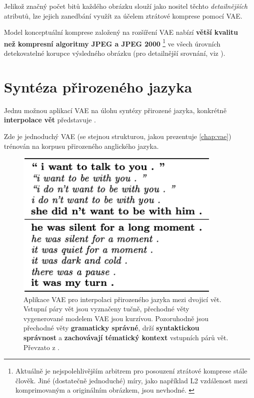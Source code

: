 Jelikož značný počet bitů každého obrázku slouží jako nositel těchto \emph{detailnějších} atributů, lze jejich zanedbání využít za účelem ztrátové komprese pomocí VAE.

Model konceptuální komprese založený na rozšíření VAE nabízí \textbf{větší kvalitu než kompresní algoritmy JPEG a JPEG 2000}
\footnote{Aktuálně je nejspolehlivějším arbitrem pro posouzení ztrátové komprese stále člověk. Jiné (dostatečně jednoduché) míry, jako například L2 vzdálenost mezi komprimovaným a originálním obrázkem, jsou nevhodné. \cite{Gregor2016}} ve všech úrovních detekovatelné korupce výsledného obrázku (pro detailnější srovnání, viz \cite{Gregor2016}).

\newpage
\section{Syntéza přirozeného jazyka}
\label{sec:applications_language_synthesis}
Jednu možnou aplikací VAE na úlohu syntézy přirozené jazyka, konkrétně \textbf{interpolace vět} představuje \cite{Bowman2016}.

Zde je jednoduchý VAE (se stejnou strukturou, jakou prezentuje \autoref{chap:vae}) trénován na korpusu přirozeného anglického jazyka.

\begin{figure}[H]
    \centering
    \includegraphics[width=0.9\textwidth]{figures/applications/vae_sentence_interpolation_bowman.png}
    \caption{Aplikace VAE pro interpolaci přirozeného jazyka mezi dvojicí vět. Vstupní páry vět jsou vyznačeny tučně, přechodné věty vygenerované modelem VAE jsou kurzívou.
    Pozoruhodně jsou přechodné věty \textbf{gramaticky správné}, drží \textbf{syntaktickou správnost} a \textbf{zachovávají tématický kontext} vstupních párů vět. Převzato z \cite{Bowman2016}.}
    \label{fig:vae_sentence_interpolation_bowman}
\end{figure}

